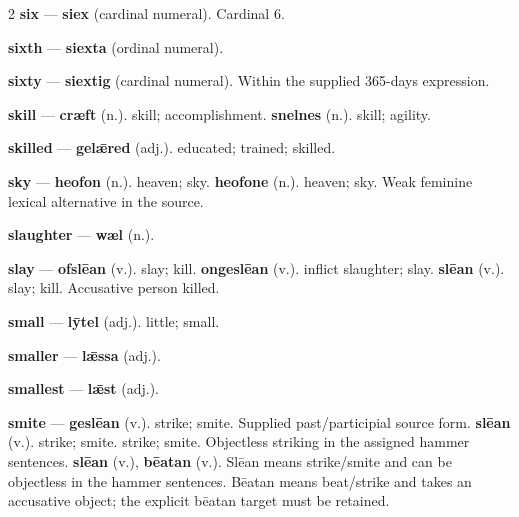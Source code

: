 \begin{multicols}{2}
\textbf{six} — \textbf{siex} (cardinal numeral). Cardinal 6.\par
\textbf{sixth} — \textbf{siexta} (ordinal numeral).\par
\textbf{sixty} — \textbf{siextig} (cardinal numeral). Within the supplied 365-days expression.\par
\textbf{skill} — \textbf{cræft} (n.). skill; accomplishment. \textbf{snelnes} (n.). skill; agility.\par
\textbf{skilled} — \textbf{gelǣred} (adj.). educated; trained; skilled.\par
\textbf{sky} — \textbf{heofon} (n.). heaven; sky. \textbf{heofone} (n.). heaven; sky. Weak feminine lexical alternative in the source.\par
\textbf{slaughter} — \textbf{wæl} (n.).\par
\textbf{slay} — \textbf{ofslēan} (v.). slay; kill. \textbf{ongeslēan} (v.). inflict slaughter; slay. \textbf{slēan} (v.). slay; kill. Accusative person killed.\par
\textbf{small} — \textbf{lȳtel} (adj.). little; small.\par
\textbf{smaller} — \textbf{lǣssa} (adj.).\par
\textbf{smallest} — \textbf{lǣst} (adj.).\par
\textbf{smite} — \textbf{geslēan} (v.). strike; smite. Supplied past/participial source form. \textbf{slēan} (v.). strike; smite. strike; smite. Objectless striking in the assigned hammer sentences. \textbf{slēan} (v.), \textbf{bēatan} (v.). Slēan means strike/smite and can be objectless in the hammer sentences. Bēatan means beat/strike and takes an accusative object; the explicit bēatan target must be retained.\par

\end{multicols}
